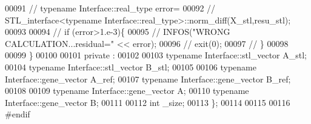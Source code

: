 \begin{DoxyCode}
00091 \textcolor{comment}{//     typename Interface::real\_type error=}
00092 \textcolor{comment}{//       STL\_interface<typename Interface::real\_type>::norm\_diff(X\_stl,resu\_stl);}
00093 
00094 \textcolor{comment}{//     if (error>1.e-3)\{}
00095 \textcolor{comment}{//       INFOS("WRONG CALCULATION...residual=" << error);}
00096 \textcolor{comment}{//       exit(0);}
00097 \textcolor{comment}{//     \}}
00098 
00099   \}
00100 
00101 private :
00102 
00103   \textcolor{keyword}{typename} Interface::stl\_vector A\_stl;
00104   \textcolor{keyword}{typename} Interface::stl\_vector B\_stl;
00105 
00106   \textcolor{keyword}{typename} Interface::gene\_vector A\_ref;
00107   \textcolor{keyword}{typename} Interface::gene\_vector B\_ref;
00108 
00109   \textcolor{keyword}{typename} Interface::gene\_vector A;
00110   \textcolor{keyword}{typename} Interface::gene\_vector B;
00111 
00112   \textcolor{keywordtype}{int} \_size;
00113 \};
00114 
00115 
00116 \textcolor{preprocessor}{#endif}
\end{DoxyCode}
